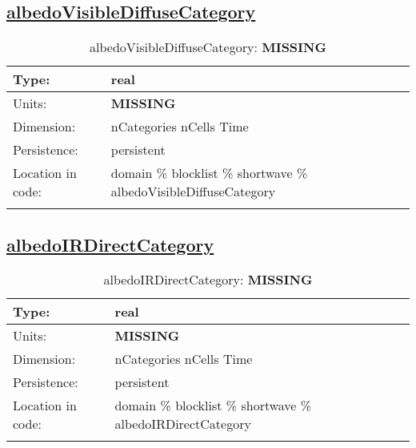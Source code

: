 \subsection[albedoVisibleDiffuseCategory]{\hyperref[sec:var_tab_shortwave]{albedoVisibleDiffuseCategory}}
\label{subsec:var_sec_shortwave_albedoVisibleDiffuseCategory}
\begin{center}
\begin{longtable}{| p{2.0in} | p{4.0in} |}
        \hline 
        Type: & real \\
        \hline 
        Units: & {\bf \color{red} MISSING} \\
        \hline 
        Dimension: & nCategories nCells Time \\
        \hline 
        Persistence: & persistent \\
        \hline 
         Location in code: & domain \% blocklist \% shortwave \% albedoVisibleDiffuseCategory \\
         \hline 
    \caption{albedoVisibleDiffuseCategory: {\bf \color{red} MISSING}}
\end{longtable}
\end{center}
\subsection[albedoIRDirectCategory]{\hyperref[sec:var_tab_shortwave]{albedoIRDirectCategory}}
\label{subsec:var_sec_shortwave_albedoIRDirectCategory}
\begin{center}
\begin{longtable}{| p{2.0in} | p{4.0in} |}
        \hline 
        Type: & real \\
        \hline 
        Units: & {\bf \color{red} MISSING} \\
        \hline 
        Dimension: & nCategories nCells Time \\
        \hline 
        Persistence: & persistent \\
        \hline 
         Location in code: & domain \% blocklist \% shortwave \% albedoIRDirectCategory \\
         \hline 
    \caption{albedoIRDirectCategory: {\bf \color{red} MISSING}}
\end{longtable}
\end{center}
